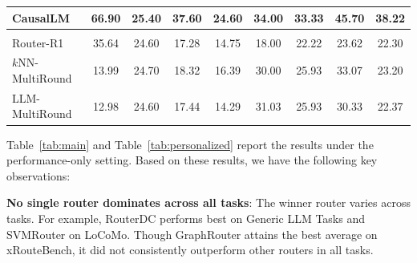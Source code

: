 \begin{table}[t]
{\begin{tabular}{lcccccccc}
CausalLM & 66.90 & 25.40 & 37.60 & 24.60 & 34.00 & \textbf{33.33} & 45.70 & 38.22 \\
\midrule
\rowcolor{barGray} \multicolumn{9}{c}{\textit{Multi-turn routers}} \\
Router-R1 & 35.64 & 24.60 & 17.28 & 14.75 & 18.00 & 22.22 & 23.62 & 22.30 \\
$k$NN-MultiRound & 13.99 & 24.70 & 18.32 & 16.39 & 30.00 & 25.93 & 33.07 & 23.20 \\
LLM-MultiRound & 12.98 & 24.60 & 17.44 & 14.29 & 31.03 & 25.93 & 30.33 & 22.37 \\
\bottomrule
\end{tabular}%
}
\vspace{-10pt}
\end{table}

Table~\ref{tab:main} and Table~\ref{tab:personalized} report the results under the performance-only setting. Based on these results, we have the following key observations:


\noindent\textbf{No single router dominates across all tasks}: The winner router varies across tasks. For example, RouterDC performs best on Generic LLM Tasks and SVMRouter on LoCoMo. Though GraphRouter attains the best average on xRouteBench, it did not consistently outperform other routers in all tasks.


